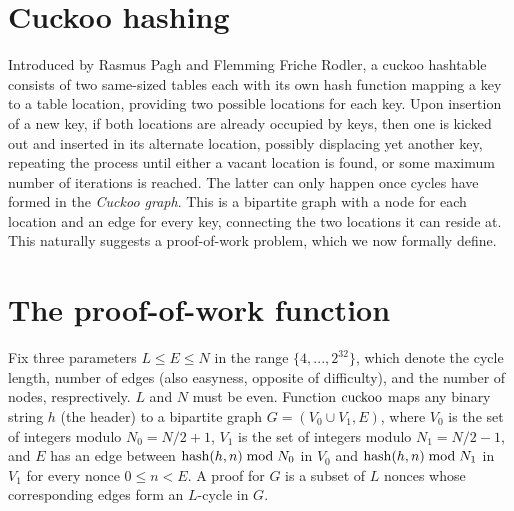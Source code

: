 \documentclass[11pt, oneside]{article}
\newcommand{\cuckoo}{{\rm cuckoo}}
\newcommand{\hash}{{\rm hash}}
\begin{document}
\section{Cuckoo hashing}
Introduced by Rasmus Pagh and Flemming Friche Rodler\cite{Pagh04cuckoohashing},
a cuckoo hashtable consists of two same-sized
tables each with its own hash function mapping a key to a table location,
providing two possible locations for each key.
Upon insertion of a new key, if both locations are already occupied by keys,
then one is kicked out and inserted in its alternate location, possibly
displacing yet another key, repeating the process until either a vacant
location is found, or some maximum number of iterations is reached.
The latter can only happen once cycles have formed in the {\em Cuckoo graph}.
This is a bipartite graph with a node for each location and an
edge for every key, connecting the two locations it can reside at.
This naturally suggests a proof-of-work problem, which we now formally define.

\section{The proof-of-work function}
Fix three parameters $L \leq E \leq N$ in the range $\{4,...,2^{32}\}$, which
denote the cycle length, number of edges (also easyness, opposite of difficulty),
and the number of nodes, resprectively. $L$ and $N$ must be even.
Function $\cuckoo$ maps any binary string $h$ (the header) to a bipartite graph
$G = (V_0 \cup V_1, E)$, where $V_0$ is the set of integers modulo $N_0=N/2+1$,
$V_1$ is the set of integers modulo $N_1=N/2-1$, and $E$ has an edge between
$\hash(h,n) \bmod N_0$ in $V_0$ and $\hash(h,n) \bmod N_1$ in $V_1$ for every
nonce $0 \leq n < E$. A proof for $G$ is a subset of $L$ nonces whose
corresponding edges form an $L$-cycle in $G$.
\end{document}
